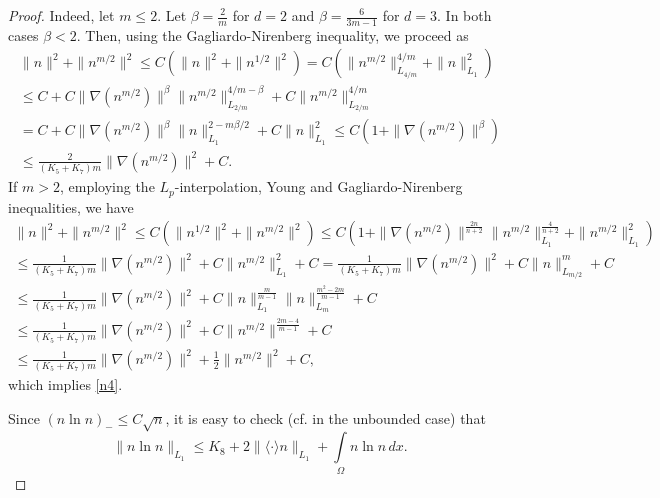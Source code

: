 \documentclass[10pt]{amsart}
\begin{document}
\begin{proof}
Indeed, let $m\leq 2$. Let $\beta=\frac 2 m$ for $d=2$ and $\beta=\frac 6 {3m-1}$ for $d=3$. In both cases $\beta<2$. Then, using the Gagliardo-Nirenberg inequality, we proceed as
\begin{multline}\label{n5}
\|n\|^2+\|n^{m/2}\|^2\leq C(\|n\|^2+\|n^{1/2}\|^2)=C(\|n^{m/2}\|^{4/m}_{L_{4/m}}+\|n\|^2_{L_1}) \\ \leq C+C\|\nabla (n^{m/2})\|^{\beta} \| n^{m/2}\|^{4/m-\beta}_{L_{2/m}}+C \| n^{m/2}\|^{4/m}_{L_{2/m}} \\ =C+C\|\nabla (n^{m/2})\|^{\beta} \| n\|^{2-m\beta/2}_{L_{1}}+C\| n\|^{2}_{L_{1}}\leq C(1+\|\nabla (n^{m/2})\|^{\beta}) \\ \leq \frac 2 {(K_5 +K_7) m} \|\nabla(n^{m/2})\|^2 + C.
\end{multline}
If $m> 2$, employing the $L_p$-interpolation, Young and Gagliardo-Nirenberg inequalities, we have
\begin{multline}\label{n7}\|n\|^2+\|n^{m/2}\|^2\leq C(\|n^{1/2}\|^2+\|n^{m/2}\|^2)\leq C(1+\|\nabla (n^{m/2})\|^{\frac {2n}{n+2}}\|n^{m/2}\|^{\frac 4{n+2}}_{L_1} +\|n^{m/2}\|^2_{L_1}) \\ \leq \frac 1 {(K_5 +K_7) m} \|\nabla(n^{m/2})\|^2+ C\|n^{m/2}\|^2_{L_1} + C= \frac 1 {(K_5 +K_7) m} \|\nabla(n^{m/2})\|^2+ C\|n\|^m_{L_{m/2}} + C \\ \leq \frac 1 {(K_5 +K_7) m} \|\nabla(n^{m/2})\|^2+ C\|n\|^{\frac {m}{m-1}}_{L_{1}}\|n\|^{\frac {m^2-2m}{m-1}}_{L_{m}} + C \\ \leq \frac 1 {(K_5 +K_7) m} \|\nabla(n^{m/2})\|^2+ C\|n^{m/2}\|^{\frac {2m-4}{m-1}} + C \\ \leq \frac 1 {(K_5 +K_7) m} \|\nabla(n^{m/2})\|^2+ \frac 1 2 \|n^{m/2}\|^{2} + C,\end{multline}
which implies \eqref{n4}.

Since $(n\ln n)_-\leq C \sqrt n$, it is easy to check (cf. \cite{ckl11} in the unbounded case) that  \begin{equation} \label{intm} \| n\ln n \|_{L_{1}}  \leq  K_8 +2 \| \langle\cdot\rangle n\|_{L_{1}}+ \int\limits_{\Omega} n\ln n \, dx.  \end{equation}  


\end{proof}
\end{document}
